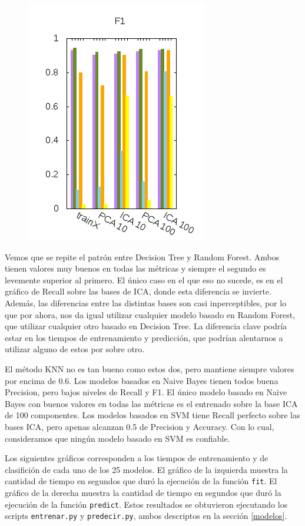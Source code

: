 \documentclass[10pt, a4paper]{article}
\begin{document}
\begin{figure}[H]
\begin{minipage}{1\textwidth}
	\includegraphics[scale=0.5]{../src/data/vf1.png}
  \end{minipage}
\end{figure}

Vemos que se repite el patrón entre Decision Tree y Random Forest. Ambos tienen valores muy buenos en todas las métricas y siempre el segundo es levemente superior al primero. El único caso en el que eso no sucede, es en el gráfico de Recall sobre las bases de ICA, donde esta diferencia se invierte. Además, las diferencias entre las distintas bases son casi inperceptibles, por lo que por ahora, nos da igual utilizar cualquier modelo basado en Random Forest, que utilizar cualquier otro basado en Decision Tree. La diferencia clave podría estar en los tiempos de entrenamiento y predicción, que podrían alentarnos a utilizar alguno de estos por sobre otro.

El método KNN no es tan bueno como estos dos, pero mantiene siempre valores por encima de 0.6. Los modelos basados en Naive Bayes tienen todos buena Precision, pero bajos niveles de Recall y F1. El único modelo basado en Naive Bayes con buenos valores en todas las métricas es el entrenado sobre la base ICA de 100 componentes. Los modelos basados en SVM tiene Recall perfecto sobre las bases ICA, pero apenas alcanzan 0.5 de Precision y Accuracy. Con lo cual, consideramos que ningún modelo basado en SVM es confiable.

Los siguientes gráficos corresponden a los tiempos de entrenamiento y de clasifición de cada uno de los 25 modelos. El gráfico de la izquierda muestra la cantidad de tiempo en segundos que duró la ejecución de la función \texttt{fit}. El gráfico de la derecha muestra la cantidad de tiempo en segundos que duró la ejecución de la función \texttt{predict}. Estos resultados se obtuvieron ejecutando los scripts \texttt{entrenar.py} y \texttt{predecir.py}, ambos descriptos en la sección \ref{modelos}.
\end{document}
